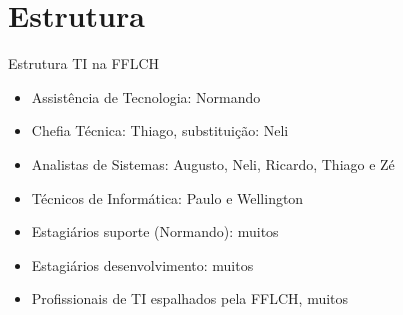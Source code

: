 \section{Estrutura}

\begin{frame}{Estrutura TI na FFLCH}

\begin{itemize}[<+-|alert@+>]\color{gray}
    \item Assistência de Tecnologia: Normando
    \item Chefia Técnica: Thiago, substituição: Neli
    \item Analistas de Sistemas: Augusto, Neli, Ricardo, Thiago e Zé
    \item Técnicos de Informática: Paulo e Wellington
    \item Estagiários suporte (Normando): muitos 
    \item Estagiários desenvolvimento: muitos 
    \item Profissionais de TI espalhados pela FFLCH, muitos
\end{itemize}

\end{frame}